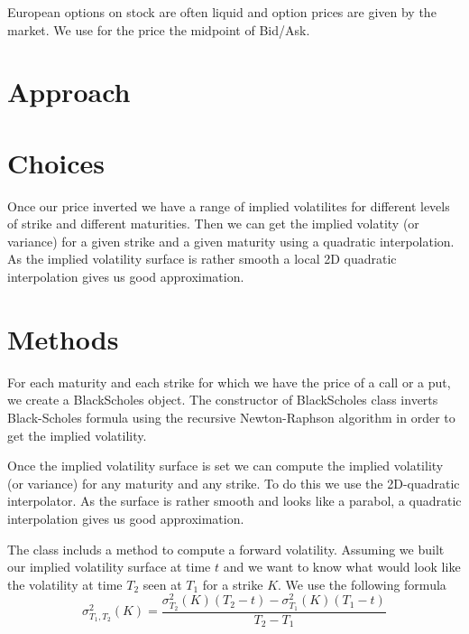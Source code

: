 European options on stock are often liquid and option prices are given by the market. We use for the price the midpoint of Bid/Ask.



\section{Approach}

\section{Choices}
Once our price inverted we have a range of implied volatilites for different levels of strike and different maturities. Then we can get the implied volatity (or variance) for a given strike and a given maturity using a quadratic interpolation.
As the implied volatility surface is rather smooth a local 2D quadratic interpolation gives us good approximation.


\section{Methods}
For each maturity and each strike for which we have the price of a call or a put, we create a BlackScholes object. The constructor of BlackScholes class inverts Black-Scholes formula using the recursive Newton-Raphson algorithm in order to get the implied volatility.

Once the implied volatility surface is set we can compute the implied volatility (or variance) for any maturity and any strike.
To do this we use the 2D-quadratic interpolator.
As the surface is rather smooth and looks like a parabol, a quadratic interpolation gives us good approximation.

The class includs a method to compute a forward volatility. Assuming we built our implied volatility surface at time $t$ and we want to know what would look like the volatility at time $T_2$ seen at $T_1$ for a strike $K$. We use the following formula
\[
\sigma_{T_1,T_2}^2(K)=\frac{\sigma_{T_2}^2(K)(T_2-t)-\sigma_{T_1}^2(K)(T_1-t)}{T_2-T_1}
\]

